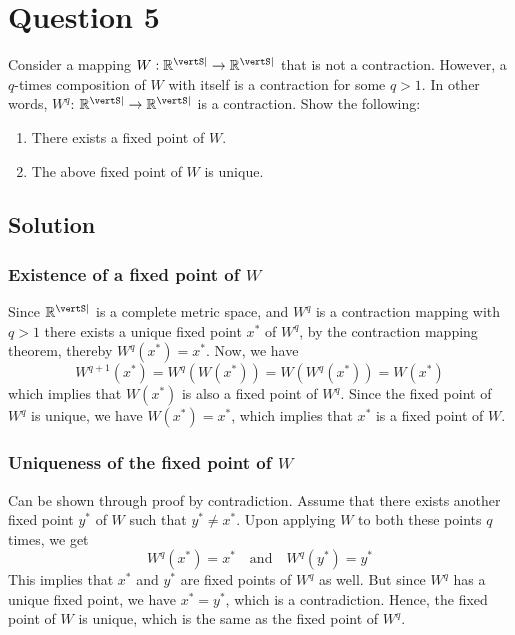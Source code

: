 \section*{Question 5}

Consider a mapping \( W: \mathbb{R}^{\vertS\vert} \rightarrow \mathbb{R}^{\vertS\vert} \) that is not a contraction.
However, a \( q \)-times composition of \( W \) with itself is a contraction for some \( q>1 \).
In other words, \( W^{q} \): \( \mathbb{R}^{\vertS\vert} \rightarrow \mathbb{R}^{\vertS\vert} \) is a contraction.
Show the following:
\begin{enumerate}[noitemsep]
    \item There exists a fixed point of \( W \).
    \item The above fixed point of \( W \) is unique.
\end{enumerate}

\subsection*{Solution}

\subsubsection*{Existence of a fixed point of \( W \)}

Since \( \mathbb{R}^{\vertS\vert} \) is a complete metric space, and \( W^{q} \) is a contraction mapping with \( q > 1 \) there exists a unique fixed point \( x^{*} \) of \( W^{q} \), by the contraction mapping theorem, thereby \( W^{q}(x^{*}) = x^{*} \).
Now, we have
\[
    W^{q+1}(x^{*}) = W^{q}(W(x^{*})) = W(W^{q}(x^{*})) = W(x^{*})
\]
which implies that \( W(x^{*}) \) is also a fixed point of \( W^{q} \).
Since the fixed point of \( W^{q} \) is unique, we have \( W(x^{*}) = x^{*} \), which implies that \( x^{*} \) is a fixed point of \( W \).

\subsubsection*{Uniqueness of the fixed point of \( W \)}

Can be shown through proof by contradiction.
Assume that there exists another fixed point \( y^{*} \) of \( W \) such that \( y^{*} \neq x^{*} \).
Upon applying \( W \) to both these points \( q \) times, we get
\[
    W^{q}(x^{*}) = x^{*} \quad \text{and} \quad W^{q}(y^{*}) = y^{*}
\]
This implies that \( x^{*} \) and \( y^{*} \) are fixed points of \( W^{q} \) as well.
But since \( W^{q} \) has a unique fixed point, we have \( x^{*} = y^{*} \), which is a contradiction.
Hence, the fixed point of \( W \) is unique, which is the same as the fixed point of \( W^{q} \).
